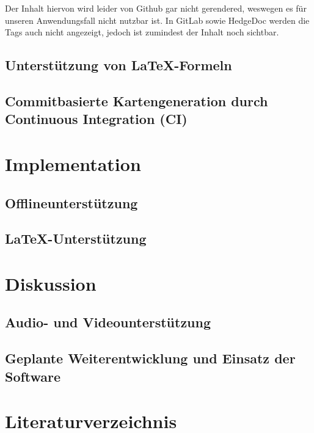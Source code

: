 \documentclass[ngerman]{article}
\begin{document}
Der Inhalt hiervon wird leider von Github gar nicht gerendered, weswegen es für unseren Anwendungsfall nicht nutzbar ist. In GitLab sowie HedgeDoc werden die Tags auch nicht angezeigt, jedoch ist zumindest der Inhalt noch sichtbar.

\subsection{Unterst\"utzung von \LaTeX-Formeln}
\subsection{Commitbasierte Kartengeneration durch Continuous Integration (CI)}
\section{Implementation}
\subsection{Offlineunterst\"utzung}
\subsection{\LaTeX-Unterst\"utzung}
\section{Diskussion}
\subsection{Audio- und Videounterst\"utzung}
\subsection{Geplante Weiterentwicklung und Einsatz der Software}
\newpage
\section{Literaturverzeichnis}
\printbibliography
\end{document}
